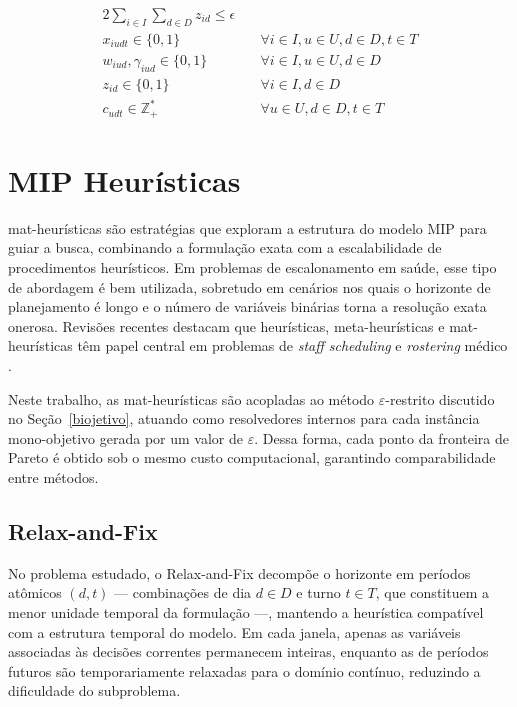 \begin{alignat}{2}
    \sum_{i \in I}\sum_{d \in D} z_{id} \leq \epsilon \quad               &                                              \\
    x_{iudt} \in \{0,1\} \quad                                            & \forall i \in I, u \in U, d \in D, t \in T   \\
    w_{iud}, \gamma_{iud} \in \{0,1\} \quad                               & \forall i \in I, u \in U, d \in D            \\
    z_{id} \in \{0,1\} \quad                                              & \forall i \in I, d \in D                     \\
    c_{udt} \in \mathbb{Z}^{*}_{+} \quad                                  & \forall u \in U, d \in D, t \in T
\end{alignat}

\section{MIP Heurísticas}\label{mipheuristicas}

mat-heurísticas são estratégias que exploram a estrutura do modelo MIP para guiar a busca, combinando a formulação exata com a escalabilidade de procedimentos heurísticos. Em problemas de escalonamento em saúde, esse tipo de abordagem é bem utilizada, sobretudo em cenários nos quais o horizonte de planejamento é longo e o número de variáveis binárias torna a resolução exata onerosa. Revisões recentes destacam que heurísticas, meta-heurísticas e mat-heurísticas têm papel central em problemas de \textit{staff scheduling} e \textit{rostering} médico \cite{Ngoo_Goh_Sze_Sabar_Abdullah_Kendall_2022,Abdalkareem2021_ac}.

Neste trabalho, as mat-heurísticas são acopladas ao método $\varepsilon$-restrito discutido no Seção~\ref{biojetivo}, atuando como resolvedores internos para cada instância mono-objetivo gerada por um valor de $\varepsilon$. Dessa forma, cada ponto da fronteira de Pareto é obtido sob o mesmo custo computacional, garantindo comparabilidade entre métodos.

\subsection{Relax-and-Fix}

No problema estudado, o Relax-and-Fix decompõe o horizonte em períodos atômicos $(d,t)$ — combinações de dia $d \in D$ e turno $t \in T$, que constituem a menor unidade temporal da formulação —, mantendo a heurística compatível com a estrutura temporal do modelo. Em cada janela, apenas as variáveis associadas às decisões correntes permanecem inteiras, enquanto as de períodos futuros são temporariamente relaxadas para o domínio contínuo, reduzindo a dificuldade do subproblema.

